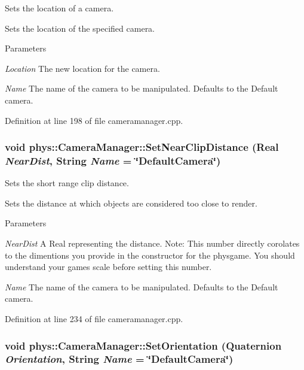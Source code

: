 Sets the location of a camera. 

Sets the location of the specified camera. 
\begin{DoxyParams}{Parameters}
\item[{\em Location}]The new location for the camera. \item[{\em Name}]The name of the camera to be manipulated. Defaults to the Default camera. \end{DoxyParams}


Definition at line 198 of file cameramanager.cpp.

\hypertarget{classphys_1_1CameraManager_ad639c275a2bb1c6c05a8800f8e8412c6}{
\subsubsection[{SetNearClipDistance}]{\setlength{\rightskip}{0pt plus 5cm}void phys::CameraManager::SetNearClipDistance ({\bf Real} {\em NearDist}, \/  {\bf String} {\em Name} = {\ttfamily \char`\"{}DefaultCamera\char`\"{}})}}
\label{d9/d91/classphys_1_1CameraManager_ad639c275a2bb1c6c05a8800f8e8412c6}


Sets the short range clip distance. 

Sets the distance at which objects are considered too close to render. 
\begin{DoxyParams}{Parameters}
\item[{\em NearDist}]A Real representing the distance. Note: This number directly corolates to the dimentions you provide in the constructor for the physgame. You should understand your games scale before setting this number. \item[{\em Name}]The name of the camera to be manipulated. Defaults to the Default camera. \end{DoxyParams}


Definition at line 234 of file cameramanager.cpp.

\hypertarget{classphys_1_1CameraManager_a9d0fac66fbc2eb4b7247c9661427afb8}{
\subsubsection[{SetOrientation}]{\setlength{\rightskip}{0pt plus 5cm}void phys::CameraManager::SetOrientation ({\bf Quaternion} {\em Orientation}, \/  {\bf String} {\em Name} = {\ttfamily \char`\"{}DefaultCamera\char`\"{}})}}
\label{d9/d91/classphys_1_1CameraManager_a9d0fac66fbc2eb4b7247c9661427afb8}


